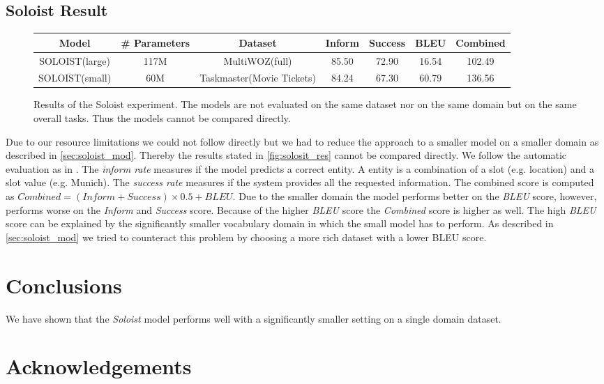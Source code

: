 \documentclass[twocolumn]{tum-article}
\begin{document}
\subsection{Soloist Result}
\begin{figure}[!h]
\centering
\begin{tabular}{c|c|c|c|c|c|c}
\hline
\textbf{Model} & \textbf{\# Parameters} & \textbf{Dataset} & \textbf{Inform} & \textbf{Success} & \textbf{BLEU} & \textbf{Combined}\\
\hline
SOLOIST(large) & 117M & MultiWOZ(full) & 85.50 & 72.90 & 16.54 & 102.49 \\
\hline
SOLOIST(small) & 60M & Taskmaster(Movie Tickets) & 84.24 & 67.30 & 60.79 & 136.56\\
\hline
\end{tabular}
\caption{Results of the Soloist experiment. The models are not evaluated on the same dataset nor on the same domain but on the same overall tasks. Thus the models cannot be compared directly. }
\label{fig:solosit_res}
\end{figure}
Due to our resource limitations we could not follow \cite{peng2020soloist} directly but we had to reduce the approach to a smaller model on a smaller domain as described in \autoref{sec:soloist_mod}. Thereby the results stated in \autoref{fig:solosit_res} cannot be compared directly. 
We follow the automatic evaluation as in \cite{peng2020soloist, budzianowski2020multiwoz}. The \textit{inform rate} measures if the model predicts a correct entity. A entity is a combination of a slot (e.g. location) and a slot value (e.g. Munich). The \textit{success rate} measures if the system provides all the requested information. The combined score is computed as $Combined = (Inform + Success) \times 0.5 + BLEU$.
Due to the smaller domain the model performs better on the \textit{BLEU} score, however, performs worse on the \textit{Inform} and \textit{Success} score. Because of the higher \textit{BLEU} score the \textit{Combined} score is higher as well. 
The high \textit{BLEU} score can be explained by the significantly smaller vocabulary domain in which the small model has to perform. As described in \autoref{sec:soloist_mod} we tried to counteract this problem by choosing a more rich dataset with a lower BLEU score.  
\section{Conclusions}
We have shown that the \textit{Soloist} model performs well with a significantly smaller setting on a single domain dataset.   

\section*{Acknowledgements}




\end{document}
